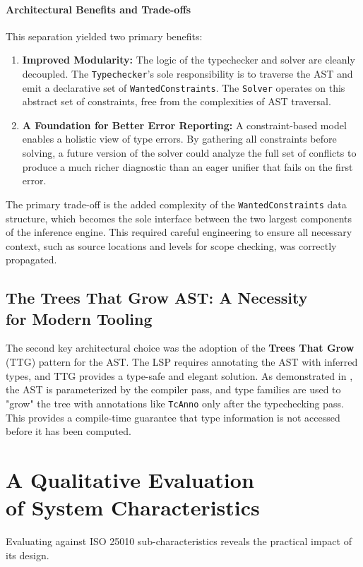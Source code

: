 \paragraph{Architectural Benefits and Trade-offs}
This separation yielded two primary benefits:
\begin{enumerate}
    \item \textbf{Improved Modularity:} The logic of the typechecker and solver are cleanly decoupled. The \texttt{Typechecker}'s sole responsibility is to traverse the AST and emit a declarative set of \texttt{WantedConstraints}. The \texttt{Solver} operates on this abstract set of constraints, free from the complexities of AST traversal.
    \item \textbf{A Foundation for Better Error Reporting:} A constraint-based model enables a holistic view of type errors. By gathering all constraints before solving, a future version of the solver could analyze the full set of conflicts to produce a much richer diagnostic than an eager unifier that fails on the first error.
\end{enumerate}

The primary trade-off is the added complexity of the \texttt{WantedConstraints} data structure, which becomes the sole interface between the two largest components of the inference engine. This required careful engineering to ensure all necessary context, such as source locations and levels for scope checking, was correctly propagated.

\subsection[The Trees That Grow AST: A Necessity for Modern Tooling]{The Trees That Grow AST: A Necessity \\ for Modern Tooling}
The second key architectural choice was the adoption of the \textbf{Trees That Grow} (TTG) pattern for the AST. The LSP requires annotating the AST with inferred types, and TTG provides a type-safe and elegant solution. As demonstrated in , the AST is parameterized by the compiler pass, and type families are used to "grow" the tree with annotations like \texttt{TcAnno} only after the typechecking pass. This provides a compile-time guarantee that type information is not accessed before it has been computed.

\section[A Qualitative Evaluation of System Characteristics]{A Qualitative Evaluation \\ of System Characteristics}
\label{sec:Discussion:Characteristics}
Evaluating \Arralac against ISO 25010 \cite{iso-25010} sub-characteristics reveals the practical impact of its design.

